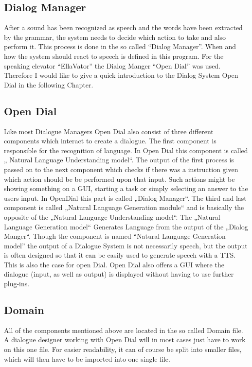 \subsection{Dialog Manager}

After a sound has been recognized as speech and the words have been extracted by the grammar, the system needs to decide which action to take and also perform it.
This process is done in the so called “Dialog Manager”. When and how the system should react to speech is defined in this program.
For the speaking elevator “EllaVator” the Dialog Manger “Open Dial” was used.
Therefore I would like to give a quick introduction to the Dialog System Open Dial in the following Chapter.

\subsection{Open Dial}

Like most Dialogue Managers Open Dial also consist of three different components which interact to create a dialogue. 
The first component is responsible for the recognition of language. 
In Open Dial this component is called „ Natural Language Understanding model“. 
The output of the first process is passed on to the next component which checks if there was a instruction given which action should be  be performed upon that input. 
Such actions might be showing something on a GUI, starting a task or simply selecting an answer to the users input. 
In OpenDial this part is called „Dialog Manager“.
The third and last component is called „Natural Language Generation module“ and is basically the opposite of the „Natural Language Understanding model“. 
The „Natural Language Generation model“ Generates Language from the output of the „Dialog Manger“. 
Though the component is named “Natural Language Generation model” the output of a Dialogue System is not necessarily speech, but the output is often designed so that it can be easily used to generate speech with a TTS. 
This is also the case for open Dial. 
Open Dial also offers a GUI where the dialogue (input, as well as output) is displayed without having to use further plug-ins.

\subsection{Domain}

All of the components mentioned above are located in the so called Domain file.
A dialogue designer working with Open Dial will in most cases just have to work on this one file. For easier readability, it can of course be split into smaller files, which will then have to be imported into one single file.

